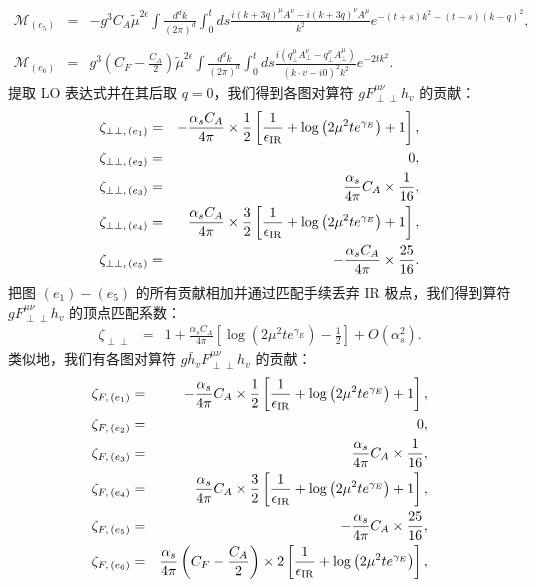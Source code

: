 \begin{eqnarray}
\label{eq:e5}
\mathcal{M}_{(e_5)}
&=&-g^3C_A\tilde{\mu}^{2\epsilon}\int\frac{d^dk}{(2\pi)^d }\int_0^t ds\frac{i(k+3q)^{\mu}A^{\nu}-i(k+3q)^{\nu}A^{\mu}}{k^2}e^{-(t+s)k^2-(t-s)(k-q)^2},\nonumber\\\\
\mathcal{M}_{(e_6)}
&=&g^3\left(C_F-\frac{C_A}{2}\right)\tilde{\mu}^{2\epsilon}\int\frac{d^dk}{(2\pi)^d }\int_0^t ds\frac{i\left(q^{\mu}_{\perp}A^{\nu}_{\perp}-q^{\nu}_{\perp}A^{\mu}_{\perp}\right)}{(k\cdot v-i0)^2k^2}e^{-2tk^2}.
\end{eqnarray}
提取 LO 表达式并在其后取 $q=0$，我们得到各图对算符 $gF^{\mu\nu}_{\perp\perp}h_v$ 的贡献：
\begin{eqnarray}
\label{eq:e1perpperpsimresult}
\zeta_{\perp\perp,\, (e_1)}&=&
-\frac{\alpha_sC_A}{4\pi}\times \frac{1}{2} \left[\frac{1}{\epsilon_{\rm IR}}+\log\left(2\mu^2 te^{\gamma_E}\right) +1\right],\\
\label{eq:e2perpperp}
\zeta_{\perp\perp,\, (e_2)}
&=&0,\\
\label{eq:e3perpperpresult}
\zeta_{\perp\perp,\, (e_3)}
&=&\frac{\alpha_s}{4\pi}C_A\times\frac{1}{16},\\
\label{eq:e4perpperpresult}
\zeta_{\perp\perp,\, (e_4)}&=&\frac{\alpha_sC_A}{4\pi}\times \frac{3}{2} \left[\frac{1}{\epsilon_{\rm IR}}+\log\left(2\mu^2 te^{\gamma_E}\right) +1\right],\\
\label{eq:e5perperpresult}
\zeta_{\perp\perp,\, (e_5)}
&=&- \frac{\alpha_sC_A}{4\pi}\times\frac{25}{16}.
\end{eqnarray}
把图 $(e_1) - (e_5)$ 的所有贡献相加并通过匹配手续丢弃 IR 极点，我们得到算符 $gF^{\mu\nu}_{\perp\perp}h_v$ 的顶点匹配系数：
\begin{eqnarray}
\label{eq:resultgluonvertexperpperp}
\zeta_{\perp\perp} &=& 1+  \frac{\alpha_sC_A}{4\pi}\left[\log\left(2\mu^2 te^{\gamma_E}\right) -\frac{1}{2}\right]+ O(\alpha_s^2).
\end{eqnarray}
类似地，我们有各图对算符 $g\bar{h}_vF^{\mu\nu}_{\perp\perp}h_v$ 的贡献：
\begin{eqnarray}
\zeta_{F,\, (e_1)}   &=& - \frac{\alpha_s}{4\pi}C_A\times \frac{1}{2}\left[\frac{1}{\epsilon_{\rm IR}} +\log\left(2\mu^2 te^{\gamma_E}\right) + 1\right],\\
\zeta_{F,\, (e_2)}   &=& 0,\\
\zeta_{F,\, (e_3)} &=&\frac{\alpha_s}{4\pi}C_A\times \frac{1}{16},\\
\zeta_{F,\, (e_4)}   &=&  \frac{\alpha_s}{4\pi}C_A\times \frac{3}{2}\left[\frac{1}{\epsilon_{\rm IR}} +\log\left(2\mu^2 te^{\gamma_E}\right) + 1\right],\\
\zeta_{F,\, (e_5)}   &=& - \frac{\alpha_s}{4\pi}C_A\times \frac{25}{16},\\
\zeta_{F,\, (e_6)}  &= & \frac{\alpha_s}{4\pi}\left(C_F -\frac{C_A }{2}\right)\times  2\left[\frac{1}{\epsilon_{\rm IR}} +\log\left(2\mu^2 te^{\gamma_E}\right)\right],
\end{eqnarray}
